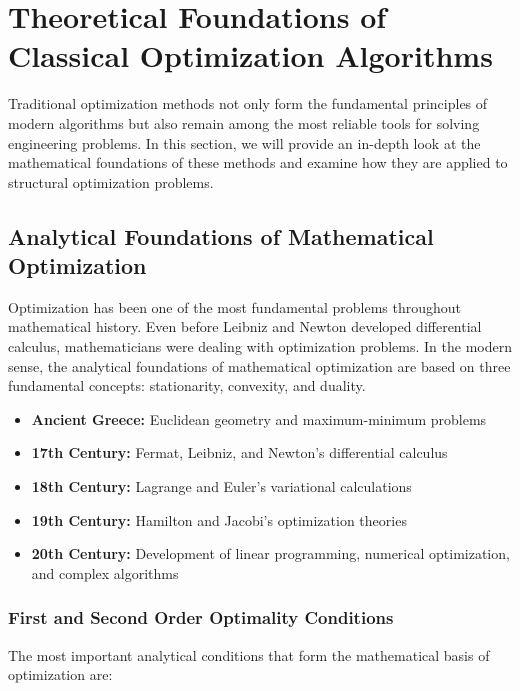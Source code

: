 \section{Theoretical Foundations of Classical Optimization Algorithms}

Traditional optimization methods not only form the fundamental principles of modern algorithms but also remain among the most reliable tools for solving engineering problems. In this section, we will provide an in-depth look at the mathematical foundations of these methods and examine how they are applied to structural optimization problems.

\subsection{Analytical Foundations of Mathematical Optimization}

Optimization has been one of the most fundamental problems throughout mathematical history. Even before Leibniz and Newton developed differential calculus, mathematicians were dealing with optimization problems. In the modern sense, the analytical foundations of mathematical optimization are based on three fundamental concepts: stationarity, convexity, and duality.

\begin{tcolorbox}[title=Historical Perspective]
\begin{itemize}
    \item \textbf{Ancient Greece:} Euclidean geometry and maximum-minimum problems
    \item \textbf{17th Century:} Fermat, Leibniz, and Newton's differential calculus
    \item \textbf{18th Century:} Lagrange and Euler's variational calculations
    \item \textbf{19th Century:} Hamilton and Jacobi's optimization theories
    \item \textbf{20th Century:} Development of linear programming, numerical optimization, and complex algorithms
\end{itemize}
\end{tcolorbox}

\subsubsection{First and Second Order Optimality Conditions}

The most important analytical conditions that form the mathematical basis of optimization are:

